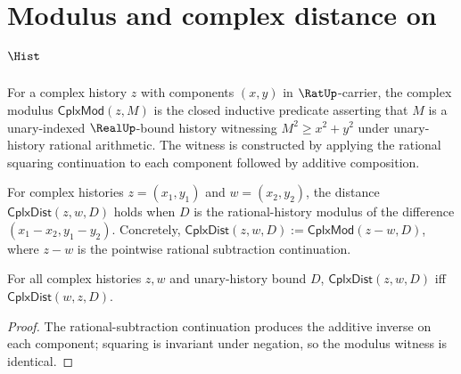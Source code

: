 \section{Modulus and complex distance on \(\Hist\)}

\begin{definition}
\label{def:cplx-modulus}
For a complex history \(z\) with components \((x, y)\) in \(\RatUp\)-carrier, the complex modulus \(\mathsf{CplxMod}(z, M)\) is the closed inductive predicate asserting that \(M\) is a unary-indexed \(\RealUp\)-bound history witnessing \(M^2 \geq x^2 + y^2\) under unary-history rational arithmetic. The witness is constructed by applying the rational squaring continuation to each component followed by additive composition.
\end{definition}

\begin{definition}
\label{def:cplx-distance}
For complex histories \(z = (x_1, y_1)\) and \(w = (x_2, y_2)\), the distance \(\mathsf{CplxDist}(z, w, D)\) holds when \(D\) is the rational-history modulus of the difference \((x_1 - x_2, y_1 - y_2)\). Concretely, \(\mathsf{CplxDist}(z, w, D) := \mathsf{CplxMod}(z - w, D)\), where \(z - w\) is the pointwise rational subtraction continuation.
\end{definition}

\begin{lemma}
\label{lem:cplx-dist-symmetric}
For all complex histories \(z, w\) and unary-history bound \(D\), \(\mathsf{CplxDist}(z, w, D)\) iff \(\mathsf{CplxDist}(w, z, D)\).
\end{lemma}
\begin{proof}
The rational-subtraction continuation produces the additive inverse on each component; squaring is invariant under negation, so the modulus witness is identical.
\end{proof}

